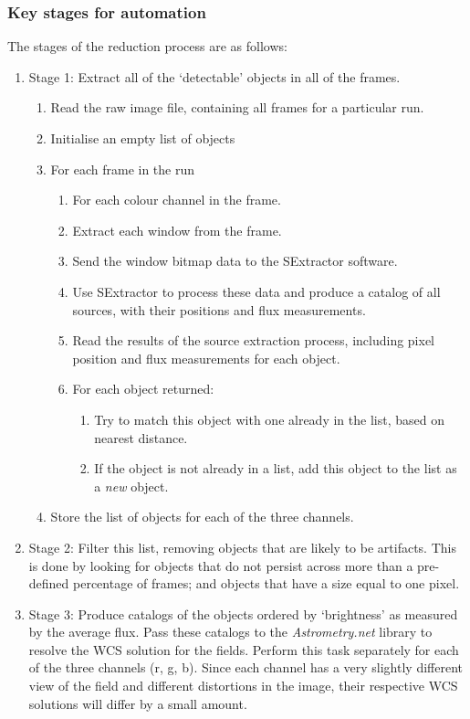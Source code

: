 \subsubsection{Key stages for automation}
The stages of the reduction process are as follows:
\begin{enumerate}
	\item Stage 1: Extract all of the `detectable' objects in all of the frames. 
	\begin{enumerate}
		\item Read the raw image file, containing all frames for a particular run.
		\item Initialise an empty list of objects
		\item For each frame in the run
		\begin{enumerate}
			\item For each colour channel in the frame.
			\item Extract each window from the frame.
			\item Send the window bitmap data to the SExtractor software.
			\item Use SExtractor to process these data and produce a catalog of all sources, with their positions and flux measurements.
			\item Read the results of the source extraction process, including pixel position and flux measurements for each object.
			\item For each object returned:
			\begin{enumerate} 
				\item Try to match this object with one already in the list, based on nearest distance.
				\item If the object is not already in a list, add this object to the list as a \emph{new} object.
			\end{enumerate}
		\end{enumerate}
		\item Store the list of objects for each of the three channels.
	\end{enumerate}
	\item Stage 2: Filter this list, removing objects that are likely to be artifacts. This is done by looking for objects that do not persist across more than a pre-defined percentage of frames; and objects that have a size equal to one pixel. 
	\item Stage 3: Produce catalogs of the objects ordered by `brightness' as measured by the average flux. Pass these catalogs to the \emph{Astrometry.net} library to resolve the WCS solution for the fields. Perform this task separately for each of the three channels (r, g, b). Since each channel has a very slightly different view of the field and different distortions in the image, their respective WCS solutions will differ by a small amount.

\end{enumerate}
